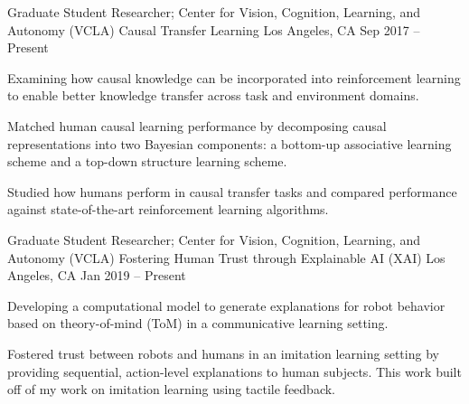 


\begin{cventries}



\cventry
{Graduate Student Researcher; Center for Vision, Cognition, Learning, and Autonomy (VCLA)}
{Causal Transfer Learning}
{Los Angeles, CA}
{Sep 2017 – Present}
{
\begin{cvitems}
\item Examining how causal knowledge can be incorporated into reinforcement learning to enable better knowledge transfer across task and environment domains.
\item Matched human causal learning performance by decomposing causal representations into two Bayesian components: a bottom-up associative learning scheme and a top-down structure learning scheme.
\item Studied how humans perform in causal transfer tasks and compared performance against state-of-the-art reinforcement learning algorithms.
\end{cvitems}
}


\cventry
{Graduate Student Researcher; Center for Vision, Cognition, Learning, and Autonomy (VCLA)}
{Fostering Human Trust through Explainable AI (XAI)}
{Los Angeles, CA}
{Jan 2019 – Present}
{
\begin{cvitems}
\item Developing a computational model to generate explanations for robot behavior based on theory-of-mind (ToM) in a communicative learning setting.
\item Fostered trust between robots and humans in an imitation learning setting by providing sequential, action-level explanations to human subjects. This work built off of my work on imitation learning using tactile feedback.
\end{cvitems}
}


\end{cventries}
